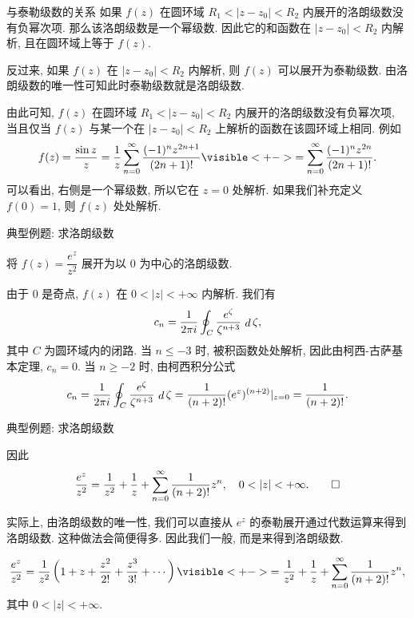 \begin{frame}{与泰勒级数的关系}
\onslide<+->
如果 $f(z)$ 在圆环域 $R_1<|z-z_0|<R_2$ 内展开的洛朗级数没有负幂次项.
\onslide<+->
那么该洛朗级数是一个幂级数.
\onslide<+->
因此它的和函数在 $|z-z_0|<R_2$ 内解析, 且在圆环域上等于 $f(z)$.

\onslide<+->
反过来, 如果 $f(z)$ 在 $|z-z_0|<R_2$ 内解析,
\onslide<+->
则 $f(z)$ 可以展开为泰勒级数.
\onslide<+->
由洛朗级数的唯一性可知此时泰勒级数就是洛朗级数.

\onslide<+->
由此可知, $f(z)$ 在圆环域 $R_1<|z-z_0|<R_2$ 内展开的洛朗级数没有负幂次项, 当且仅当 $f(z)$ 与某一个在 $|z-z_0|<R_2$ 上解析的函数在该圆环域上相同.
\onslide<+->
例如
\[f(z)=\frac{\sin z}z=\frac 1z\sum_{n=0}^\infty\frac{(-1)^nz^{2n+1}}{(2n+1)!}
\visible<+->{=\sum_{n=0}^\infty\frac{(-1)^nz^{2n}}{(2n+1)!}.}\]
\onslide<+->
可以看出, 右侧是一个幂级数, 所以它在 $z=0$ 处解析.
\onslide<+->
如果我们补充定义 $f(0)=1$, 则 $f(z)$ 处处解析.
\end{frame}


\begin{frame}{典型例题: 求洛朗级数}
\beqskip{9pt}
\begin{example}
将 $f(z)=\dfrac{e^z}{z^2}$ 展开为以 $0$ 为中心的洛朗级数.
\end{example}
\begin{solutions}
由于 $0$ 是奇点, $f(z)$ 在 $0<|z|<+\infty$ 内解析.
\onslide<+->
我们有
\[c_n=\frac1{2\pi i}\oint_C\frac{e^\zeta}{\zeta^{n+3}}\,\mathop{d}\zeta,\]
其中 $C$ 为圆环域内的闭路.
\onslide<+->
当 $n\le -3$ 时, 被积函数处处解析, 因此由柯西-古萨基本定理, $c_n=0$.
\onslide<+->
当 $n\ge -2$ 时, 由柯西积分公式
\[c_n=\frac1{2\pi i}\oint_C\frac{e^\zeta}{\zeta^{n+3}}\,\mathop{d}\zeta
=\frac1{(n+2)!}(e^z)^{(n+2)}|_{z=0}=\frac1{(n+2)!}.\]
\end{solutions}
\endgroup
\end{frame}


\begin{frame}{典型例题: 求洛朗级数}
\begin{solutionc}
因此
\vspace{-\baselineskip}
\[\frac{e^z}{z^2}=\frac1{z^2}+\frac1z+\sum_{n=0}^\infty \frac1{(n+2)!}z^n,\quad 0<|z|<+\infty.\qedhere\]
\end{solutionc}
\onslide<+->
实际上, 由洛朗级数的唯一性, 我们可以直接从 $e^z$ 的泰勒展开通过代数运算来得到洛朗级数.
\onslide<+->
这种做法会简便得多.
\onslide<+->
因此我们一般, 而是来得到洛朗级数.
\begin{solution}[另解]
\vspace{-\baselineskip}
\[\frac{e^z}{z^2}=\frac1{z^2}\left(1+z+\frac{z^2}{2!}+\frac{z^3}{3!}+\cdots\right)
\visible<+->{=\frac1{z^2}+\frac1z+\sum_{n=0}^\infty \frac1{(n+2)!}z^n,}\]
其中 $0<|z|<+\infty$.
\end{solution}
\end{frame}


